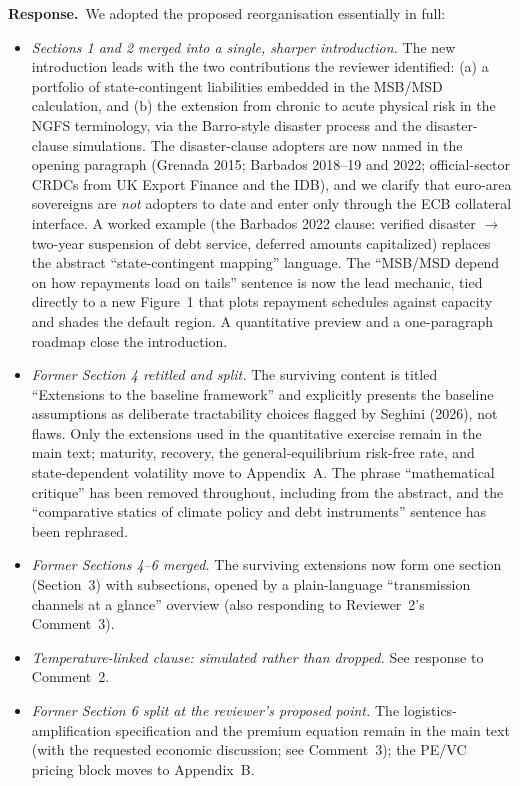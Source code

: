 \documentclass[11pt]{article}
\newcommand{\response}{\par\noindent\textbf{Response.}\ }
\begin{document}
\response We adopted the proposed reorganisation essentially in full:

\begin{itemize}
\item \emph{Sections 1 and 2 merged into a single, sharper introduction.} The new introduction leads with the two contributions the reviewer identified: (a) a portfolio of state-contingent liabilities embedded in the MSB/MSD calculation, and (b) the extension from chronic to acute physical risk in the NGFS terminology, via the Barro-style disaster process and the disaster-clause simulations. The disaster-clause adopters are now named in the opening paragraph (Grenada 2015; Barbados 2018--19 and 2022; official-sector CRDCs from UK Export Finance and the IDB), and we clarify that euro-area sovereigns are \emph{not} adopters to date and enter only through the ECB collateral interface. A worked example (the Barbados 2022 clause: verified disaster $\to$ two-year suspension of debt service, deferred amounts capitalized) replaces the abstract ``state-contingent mapping'' language. The ``MSB/MSD depend on how repayments load on tails'' sentence is now the lead mechanic, tied directly to a new Figure~1 that plots repayment schedules against capacity and shades the default region. A quantitative preview and a one-paragraph roadmap close the introduction.
\item \emph{Former Section 4 retitled and split.} The surviving content is titled ``Extensions to the baseline framework'' and explicitly presents the baseline assumptions as deliberate tractability choices flagged by Seghini (2026), not flaws. Only the extensions used in the quantitative exercise remain in the main text; maturity, recovery, the general-equilibrium risk-free rate, and state-dependent volatility move to Appendix~A. The phrase ``mathematical critique'' has been removed throughout, including from the abstract, and the ``comparative statics of climate policy and debt instruments'' sentence has been rephrased.
\item \emph{Former Sections 4--6 merged.} The surviving extensions now form one section (Section~3) with subsections, opened by a plain-language ``transmission channels at a glance'' overview (also responding to Reviewer~2's Comment~3).
\item \emph{Temperature-linked clause: simulated rather than dropped.} See response to Comment~2.
\item \emph{Former Section 6 split at the reviewer's proposed point.} The logistics-amplification specification and the premium equation remain in the main text (with the requested economic discussion; see Comment~3); the PE/VC pricing block moves to Appendix~B.

\end{itemize}
\end{document}
